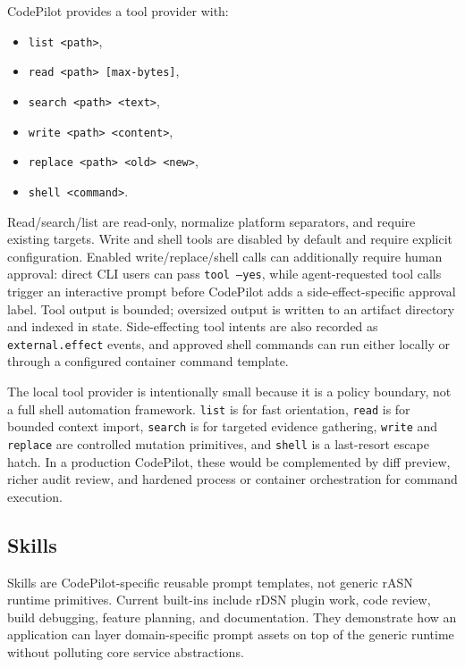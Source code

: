 \documentclass[manuscript,screen,review]{acmart}
\newcommand{\rasn}{rASN\xspace}
\newcommand{\codepilot}{CodePilot\xspace}
\begin{document}
\codepilot provides a tool provider with:

\begin{itemize}
  \item \texttt{list <path>},
  \item \texttt{read <path> [max-bytes]},
  \item \texttt{search <path> <text>},
  \item \texttt{write <path> <content>},
  \item \texttt{replace <path> <old> <new>},
  \item \texttt{shell <command>}.
\end{itemize}

Read/search/list are read-only, normalize platform separators, and require
existing targets. Write and shell tools are disabled by default and require
explicit configuration. Enabled write/replace/shell calls can additionally
require human approval: direct CLI users can pass \texttt{tool --yes}, while
agent-requested tool calls trigger an interactive prompt before CodePilot adds a
side-effect-specific approval label. Tool output is bounded; oversized output is
written to an artifact directory and indexed in state. Side-effecting tool
intents are also recorded as \texttt{external.effect} events, and approved shell
commands can run either locally or through a configured container command
template.

The local tool provider is intentionally small because it is a policy boundary,
not a full shell automation framework. \texttt{list} is for fast orientation,
\texttt{read} is for bounded context import, \texttt{search} is for targeted
evidence gathering, \texttt{write} and \texttt{replace} are controlled mutation
primitives, and \texttt{shell} is a last-resort escape hatch. In a production
CodePilot, these would be complemented by diff preview, richer audit review, and
hardened process or container orchestration for command execution.

\subsection{Skills}

Skills are \codepilot-specific reusable prompt templates, not generic \rasn
runtime primitives. Current built-ins include rDSN plugin work, code review,
build debugging, feature planning, and documentation. They demonstrate how an
application can layer domain-specific prompt assets on top of the generic
runtime without polluting core service abstractions.
\end{document}
